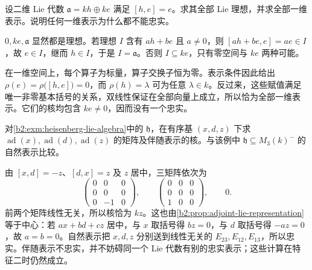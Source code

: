 \begin{optionalexercise}\label{b2:ex:20-affine-lie-ideals}
	设二维 Lie 代数 \(\mathfrak a=kh\oplus ke\) 满足 \([h,e]=e\)。求其全部 Lie 理想，并求全部一维表示。说明任何一维表示为什么都不能忠实。
\end{optionalexercise}
\begin{solution}
	\(0,ke,\mathfrak a\) 显然都是理想。若理想 \(I\) 含有 \(ah+be\) 且 \(a\ne0\)，则 \([ah+be,e]=ae\in I\)，故 \(e\in I\)，继而 \(h\in I\)，于是 \(I=\mathfrak a\)。否则 \(I\subseteq ke\)，只有零空间与 \(ke\) 两种可能。

	在一维空间上，每个算子为标量，算子交换子恒为零。表示条件因此给出 \(\rho(e)=\rho\bigl([h,e]\bigr)=0\)，而 \(\rho(h)=\lambda\) 可为任意 \(\lambda\in k\)。反过来，这些赋值满足唯一非零基本括号的关系，双线性保证在全部向量上成立，所以恰为全部一维表示。它们的核均包含 \(ke\ne0\)，因而没有一个忠实。
\end{solution}

\begin{optionalexercise}\label{b2:ex:20-heisenberg-adjoint-matrices}
	对\cref{b2:exm:heisenberg-lie-algebra}中的 \(\mathfrak h\)，在有序基 \((x,d,z)\) 下求 \(\operatorname{ad}(x),\operatorname{ad}(d),\operatorname{ad}(z)\) 的矩阵及伴随表示的核。与该例中 \(\mathfrak h\subseteq M_3(k)^-\) 的自然表示比较。
\end{optionalexercise}
\begin{solution}
	由 \([x,d]=-z\)、\([d,x]=z\) 及 \(z\) 居中，三矩阵依次为
	\[
		\begin{pmatrix}0&0&0\\0&0&0\\0&-1&0\end{pmatrix},\qquad
		\begin{pmatrix}0&0&0\\0&0&0\\1&0&0\end{pmatrix},\qquad 0.
	\]
	前两个矩阵线性无关，所以核恰为 \(kz\)。这也由\cref{b2:prop:adjoint-lie-representation}等于中心：若 \(ax+bd+cz\) 居中，与 \(x\) 取括号得 \(bz=0\)，与 \(d\) 取括号得 \(-az=0\)，故 \(a=b=0\)。自然表示把 \(x,d,z\) 分别送到线性无关的 \(E_{23},E_{12},E_{13}\)，所以忠实。伴随表示不忠实，并不妨碍同一个 Lie 代数有别的忠实表示；这些计算在特征二时仍然成立。
\end{solution}

